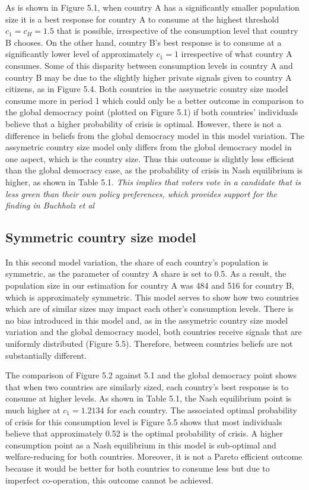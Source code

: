 \documentclass[11pt,preprint, authoryear]{elsarticle}
\numberwithin{equation}{section}
\numberwithin{figure}{section}
\numberwithin{table}{section}
\begin{document}
As is shown in Figure 5.1, when country A has a significantly smaller
population size it is a best response for country A to consume at the
highest threshold \(c_1=c_H=1.5\) that is possible, irrespective of the
consumption level that country B chooses. On the other hand, country B's
best response is to consume at a significantly lower level of
approximately \(c_1=1\) irrespective of what country A consumes. Some of
this disparity between consumption levels in country A and country B may
be due to the slightly higher private signals given to country A
citizens, as in Figure 5.4. Both countries in the assymetric country
size model consume more in period 1 which could only be a better outcome
in comparison to the global democracy point (plotted on Figure 5.1) if
both countries' individuals believe that a higher probability of crisis
is optimal. However, there is not a difference in beliefs from the
global democracy model in this model variation. The assymetric country
size model only differs from the global democracy model in one aspect,
which is the country size. Thus this outcome is slightly less efficient
than the global democracy case, as the probability of crisis in Nash
equilibrium is higher, as shown in Table 5.1. \emph{This implies that
voters vote in a candidate that is less green than their own policy
preferences, which provides support for the finding in Buchholz et al}

\hypertarget{symmetric-country-size-model}{%
\subsection*{Symmetric country size
model}\label{symmetric-country-size-model}}

In this second model variation, the share of each country's population
is symmetric, as the parameter of country A share is set to 0.5. As a
result, the population size in our estimation for country A was 484 and
516 for country B, which is approximately symmetric. This model serves
to show how two countries which are of similar sizes may impact each
other's consumption levels. There is no bias introduced in this model
and, as in the assymetric country size model variation and the global
democracy model, both countries receive signals that are uniformly
distributed (Figure 5.5). Therefore, between countries beliefs are not
substantially different.

The comparison of Figure 5.2 against 5.1 and the global democracy point
shows that when two countries are similarly sized, each country's best
response is to consume at higher levels. As shown in Table 5.1, the Nash
equilibrium point is much higher at \(c_1=1.2134\) for each country. The
associated optimal probability of crisis for this consumption level is
Figure 5.5 shows that most individuals believe that approximately 0.52
is the optimal probability of crisis. A higher consumption point as a
Nash equilibrium in this model is sub-optimal and welfare-reducing for
both countries. Moreover, it is not a Pareto efficient outcome because
it would be better for both countries to consume less but due to
imperfect co-operation, this outcome cannot be achieved.
\end{document}
